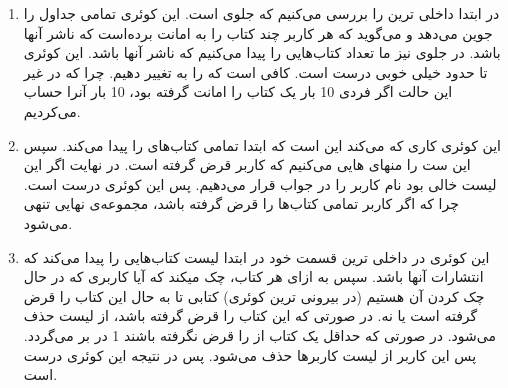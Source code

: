 \begin{enumerate}
    \item در ابتدا داخلی ترین 
    را بررسی می‌کنیم که جلوی
    است. این کوئری تمامی جداول را جوین می‌دهد و می‌گوید که هر کاربر چند کتاب را به امانت برده‌است که ناشر آنها
    باشد. در جلوی
    نیز ما تعداد کتاب‌هایی را پیدا می‌کنیم که ناشر آنها
    باشد. این کوئری تا حدود خیلی خوبی درست است. کافی است که
    را به
    تغییر دهیم. چرا که در غیر این حالت اگر فردی 10 بار یک کتاب را امانت گرفته بود، 10 بار آنرا حساب
    می‌کردیم.
    \item این کوئری کاری که می‌کند این است که ابتدا
    تمامی کتاب‌های
    را پیدا می‌کند. سپس این ست را منهای
    هایی
    می‌کنیم که کاربر قرض گرفته است. در نهایت اگر این لیست خالی بود نام کاربر را در جواب
    قرار می‌دهیم. پس این کوئری درست است. چرا که اگر کاربر تمامی کتاب‌ها را قرض گرفته باشد، مجموعه‌ی نهایی
    تنهی می‌شود.
    \item این کوئری در داخلی ترین قسمت خود در ابتدا لیست کتاب‌هایی را پیدا می‌کند که انتشارات آنها
    باشد. سپس به ازای هر کتاب، چک میکند که آیا کاربری که در حال چک کردن آن هستیم
    (در بیرونی ترین کوئری)
    کتابی تا به حال این کتاب را قرض گرفته است یا نه. در صورتی که این کتاب را قرض گرفته باشد، از لیست
    حذف می‌شود. در صورتی که حداقل یک کتاب از
    را قرض نگرفته باشند 1 در
    بر می‌گردد. پس این کاربر از لیست کاربرها حذف می‌شود. پس در نتیجه این کوئری درست است.
\end{enumerate}
